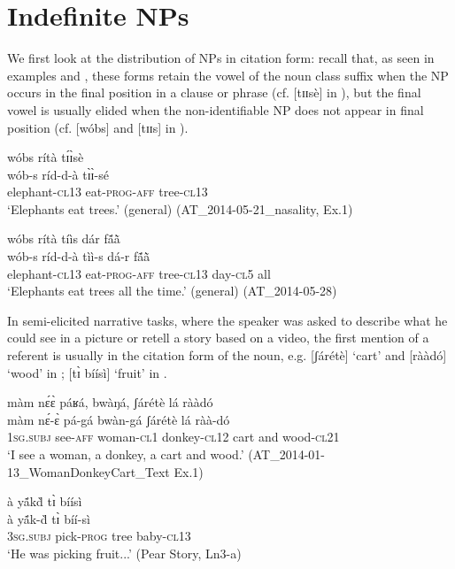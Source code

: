 \documentclass[output=paper]{langsci/langscibook}
\begin{document}
\section{Indefinite NPs}\label{sec:teo:5}

We first look at the distribution of NPs in citation form: recall that, as seen in examples  and , these forms retain the vowel of the noun class suffix when the NP occurs in the final position in a clause or phrase (cf. [tɪɪsè] in ), but the final vowel is usually elided when the non-identifiable NP does not appear in final position (cf. [wóbs] and [tɪɪs] in ).

\ea\label{ex:teo:26}
\glll wóbs rítà t\'ɪ\`ɪsè\\
 wób-s ríd-d-à t\`ɪ\`ɪ-sé\\
elephant-\textsc{cl13} eat-\textsc{prog-aff} tree-\textsc{cl13}\\
\glt ‘Elephants eat trees.’ (general) (AT\_2014-05-21\_nasality, Ex.1)
\z

\ea\label{ex:teo:27}
\glll wóbs rítà tíìs dár f\'{ã}\`{ã}\\
 wób-s ríd-d-à tìì-s dá-r f\'{ã}\`{ã}\\
elephant-\textsc{cl13} eat-\textsc{prog-aff} tree-\textsc{cl13} day-\textsc{cl5} all\\
\glt ‘Elephants eat trees all the time.’ (general) (AT\_2014-05-28)
\z

In semi-elicited narrative tasks, where the speaker was asked to describe what he could see in a picture or retell a story based on a video, the first mention of a referent is usually in the citation form of the noun, e.g. [ʃárétè] ‘cart’ and [rààdó] ‘wood’ in ; [t\`ɪ bíísì] ‘fruit’ in .

\ea\label{ex:teo:28}
\glll màm n\'ɛ\`ɛ páʁá, bwàŋá, ʃárétè lá rààdó\\
 màm n\'ɛ-\`ɛ pá-gá bwàn-gá ʃárétè lá ràà-dó\\
1\textsc{sg.subj} see-\textsc{aff} woman-\textsc{cl1} donkey-\textsc{cl12} cart and wood-\textsc{cl21}\\
\glt ‘I see a woman, a donkey, a cart and wood.’ (AT\_2014-01-13\_WomanDonkeyCart\_Text Ex.1)
\z

\ea\label{ex:teo:29}
\glll à y\'{ã}k\`{d} t\`ɪ bíísì\\
 à y\'{ã}k-\`{d}{\rmfnm} t\`ɪ bíí-sì\\
3\textsc{sg.subj} pick-\textsc{prog} tree baby-\textsc{cl13}\\
\glt ‘He was picking fruit...’ (Pear Story, Ln3-a)
\z
\end{document}
